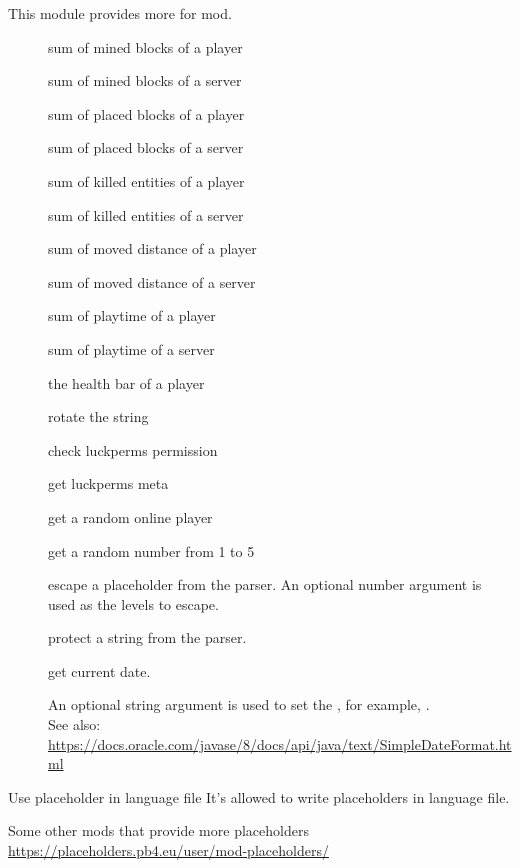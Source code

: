 This module provides more  for  mod.


\begin{description}
    \item [] sum of mined blocks of a player
    \item[] sum of mined blocks of a server
    \item[] sum of placed blocks of a player
    \item[] sum of placed blocks of a server
    \item[] sum of killed entities of a player
    \item[] sum of killed entities of a server
    \item[] sum of moved distance of a player
    \item[] sum of moved distance of a server
    \item[] sum of playtime of a player
    \item[] sum of playtime of a server
    \item[] the health bar of a player
    \item[] rotate the string 
    \item[] check luckperms permission
    \item[] get luckperms meta
    \item[] get a random online player
    \item[] get a random number from 1 to 5
    \item[] {escape a placeholder from the parser.
    An optional number argument is used as the levels to escape.}
    \item[] {protect a string from the parser.}
    \item[] {get current date.

    An optional string argument is used to set the , for example, .\\
    See also: \url{https://docs.oracle.com/javase/8/docs/api/java/text/SimpleDateFormat.html}}
\end{description}

\begin{tips}{Use placeholder in language file}
    It's allowed to write placeholders in language file.
\end{tips}

\begin{note}{Some other mods that provide more placeholders}
    \url{https://placeholders.pb4.eu/user/mod-placeholders/}
\end{note}



